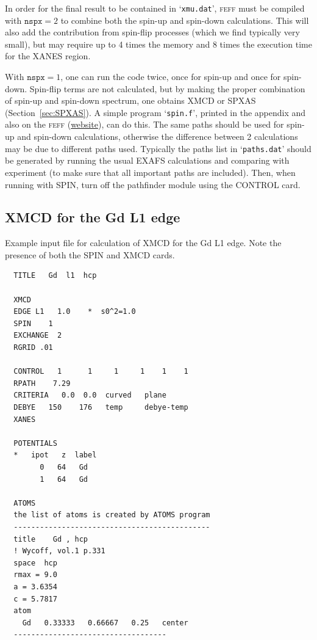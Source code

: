 \documentclass[11pt,oneside]{report} %
\renewcommand{\htmladdnormallink}[2]{\href{#2}{#1}}
\renewcommand{\htmlref}[2]{\hyperlink{#2}{#1}}
\newcommand{\program}[1]{\textsc{#1}}
\newcommand{\feff}{\program{feff}}
\newcommand{\file}[1]{`\texttt{#1}'}
\renewcommand{\htmlref}[2]{{#1}} %
\begin{document}
In order for the final result to be contained in \file{xmu.dat}, 
{\feff} must be compiled with $\mathtt{nspx}=2$ to combine both the 
spin-up and spin-down calculations. This will also add the contribution from 
spin-flip processes (which we find typically very small), but may require up 
to 4 times the memory and 8 times the execution time for the XANES region. 

With $\mathtt{nspx}=1$, one can run the code twice, once for spin-up 
and once for spin-down.  Spin-flip terms are not calculated, but by making the proper combination of spin-up and spin-down spectrum, one obtains \htmlref{XMCD}{card:xnc} or SPXAS (Section~\ref{sec:SPXAS}).  A simple program \file{spin.f}, printed in the  \htmlref{appendix}{sec:Append-F-Spinf} and also on the {\feff} 
(\htmladdnormallink{website}{http://feff.phys.washington.edu/feff/}), can do this.  The same paths should be used for spin-up and spin-down calculations, 
otherwise the difference between 2 calculations may be due to 
different paths used. Typically the paths list in \file{paths.dat} 
should be generated by running the usual EXAFS calculations and 
comparing with experiment (to make sure that all important paths 
are included). Then, when running with SPIN, turn off the pathfinder 
module using the \htmlref{CONTROL}{card:con} card.


\subsection{XMCD for the Gd L1 edge}
\label{sec:XMCD-ex}
Example input file for calculation of XMCD for the Gd L1 edge. 
Note the presence of both the \htmlref{SPIN}{card:spi} and 
\htmlref{XMCD}{card:xnc} cards.

\begin{verbatim}
  TITLE   Gd  l1  hcp 
  
  XMCD
  EDGE L1   1.0    *  s0^2=1.0
  SPIN    1
  EXCHANGE  2
  RGRID .01
 
  CONTROL   1      1     1     1    1    1
  RPATH    7.29
  CRITERIA   0.0  0.0  curved   plane
  DEBYE   150    176   temp     debye-temp
  XANES
 
  POTENTIALS
  *   ipot   z  label
        0   64   Gd
        1   64   Gd
 
  ATOMS
  the list of atoms is created by ATOMS program
  ---------------------------------------------
  title    Gd , hcp
  ! Wycoff, vol.1 p.331
  space  hcp
  rmax = 9.0
  a = 3.6354
  c = 5.7817
  atom
    Gd   0.33333   0.66667   0.25   center
  -----------------------------------
\end{verbatim}
\end{document}
